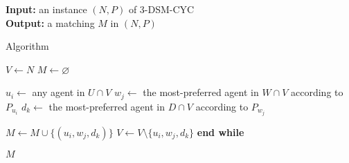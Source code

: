 \begin{algorithm}
\textbf{Input:} an instance $(N, P)$ of 3-DSM-CYC\\
\textbf{Output:} a matching $M$ in $(N, P)$
\smallskip
\begin{algorithmic}
\caption{Algorithm~ \label{alg:threed_sr_b_threedsm_cyc_dictatorshipcyc}} 
\State $V \gets N$
\State $M \gets \varnothing$

    \State $u_i \gets$ any agent in $U \cap V$
    \State $w_j \gets$ the most-preferred agent in $W \cap V$ according to $P_{u_i}$
    \State $d_k \gets$ the most-preferred agent in $D \cap V$ according to $P_{w_j}$
    
    \State $M \gets M \cup \{ ( u_i, w_j, d_k ) \}$
    \State $V \gets V \setminus \{ u_i, w_j, d_k \}$
\EndWhile
\State \textbf{end while}
\smallskip

\State \Return $M$
\end{algorithmic}
\end{algorithm}
